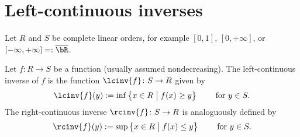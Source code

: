 \chapter{Left-continuous inverses}

Let $R$ and $S$ be complete linear orders, for example $[0,1]$, $[0,+\infty]$, or
$[-\infty,+\infty] =: \overline{\bR}$.

\begin{definition}
  \label{def:lc-inverse}
  \leanok
  Let $f \colon R \to S$ be a function (usually assumed nondecreasing).
  The left-continuous inverse of $f$ is the function $\lcinv{f} \colon S \to R$
  given by
  \begin{align*}
    \lcinv{f}(y) := \inf \big\{ x \in R \; \big| \; f(x) \ge y \big\}
    \qquad \text{ for } y \in S.
  \end{align*}
  The right-continuous inverse $\rcinv{f} \colon S \to R$ is analoguously defined by
  \begin{align*}
    \rcinv{f}(y) := \sup \big\{ x \in R \; \big| \; f(x) \le y \big\}
    \qquad \text{ for } y \in S.
  \end{align*}
\end{definition}
